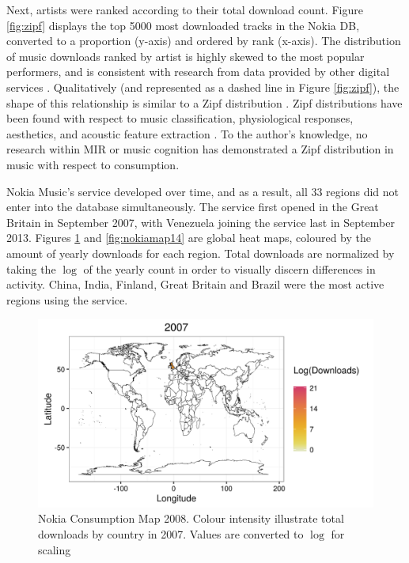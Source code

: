 \documentclass[a4paper]{article}
\begin{document}
Next, artists were ranked according to their total download count. Figure \ref{fig:zipf} displays the top 5000 most downloaded tracks in the Nokia DB, converted to a proportion (y-axis) and ordered by rank (x-axis). The distribution of music downloads ranked by artist is highly skewed to the most popular performers, and is consistent with research from data provided by other digital services \cite{anderson2007long,levy2010music}. Qualitatively (and represented as a dashed line in Figure \ref{fig:zipf}), the shape of this relationship is similar to a Zipf distribution \cite{wilson1949human}. Zipf distributions have been found with respect to music classification, physiological responses, aesthetics, and acoustic feature extraction \cite{manaris2005zipf,tzanetakis2011music}. To the author's knowledge, no research within MIR or music cognition has demonstrated a Zipf distribution in music with respect to consumption.

Nokia Music's service developed over time, and as a result, all 33 regions did not enter into the database simultaneously. The service first opened in the Great Britain in September 2007, with Venezuela joining the service last in September 2013. Figures \ref{fig:nokiamap07} and \ref{fig:nokiamap14} are global heat maps, coloured by the amount of yearly downloads for each region. Total downloads are normalized by taking the $\log$ of the yearly count in order to visually discern differences in activity. China, India, Finland, Great Britain and Brazil were the most active regions using the service.

\begin{figure}[h!]
\centering
\includegraphics[width=\linewidth]{nokiaMap07}
\caption[Nokia Consumption Map - 2007]{Nokia Consumption Map 2008. Colour intensity illustrate total downloads by country in 2007. Values are converted to $\log$ for scaling}
\label{fig:nokiamap07}
\end{figure}
\end{document}
